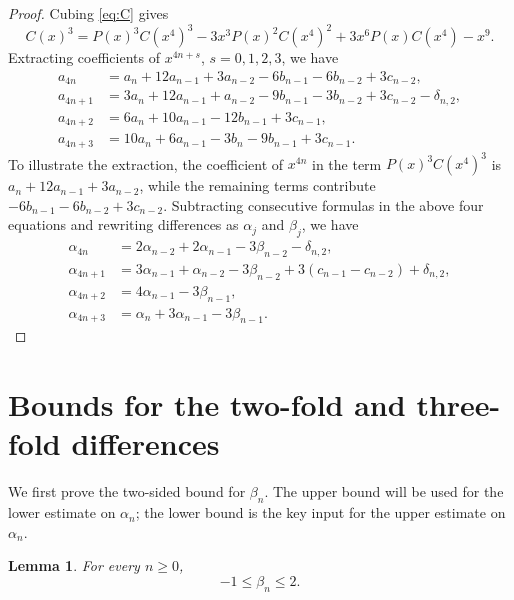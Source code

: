 \documentclass[10pt,a4paper]{amsart}
\newtheorem{lemma}[theorem]{Lemma}
\begin{document}
\begin{proof}
Cubing \eqref{eq:C} gives
\[
C(x)^3=P(x)^3C(x^4)^3-3x^3P(x)^2C(x^4)^2+3x^6P(x)C(x^4)-x^9.
\]
Extracting coefficients of $x^{4n+s}$, $s=0,1,2,3$, we have
\[
\begin{aligned}
a_{4n}&=a_n+12a_{n-1}+3a_{n-2}-6b_{n-1}-6b_{n-2}+3c_{n-2},\\
a_{4n+1}&=3a_n+12a_{n-1}+a_{n-2}-9b_{n-1}-3b_{n-2}+3c_{n-2}-\delta_{n,2},\\
a_{4n+2}&=6a_n+10a_{n-1}-12b_{n-1}+3c_{n-1},\\
a_{4n+3}&=10a_n+6a_{n-1}-3b_n-9b_{n-1}+3c_{n-1}.
\end{aligned}
\]
To illustrate the extraction, the coefficient of $x^{4n}$ in the term $P(x)^3C(x^4)^3$ is $a_n+12a_{n-1}+3a_{n-2}$, while the remaining terms contribute $-6b_{n-1}-6b_{n-2}+3c_{n-2}$.
Subtracting consecutive formulas in the above four equations and rewriting differences as $\alpha_j$ and $\beta_j$, we have
\[
\begin{aligned}
\alpha_{4n}&=2\alpha_{n-2}+2\alpha_{n-1}-3\beta_{n-2}-\delta_{n,2},\\
\alpha_{4n+1}&=3\alpha_{n-1}+\alpha_{n-2}-3\beta_{n-2}+3(c_{n-1}-c_{n-2})+\delta_{n,2},\\
\alpha_{4n+2}&=4\alpha_{n-1}-3\beta_{n-1},\\
\alpha_{4n+3}&=\alpha_n+3\alpha_{n-1}-3\beta_{n-1}.
\end{aligned}
\]
\end{proof}

\section{Bounds for the two-fold and three-fold differences}

We first prove the two-sided bound for $\beta_n$. The upper bound will be used for the lower estimate on $\alpha_n$; the lower bound is the key input for the upper estimate on $\alpha_n$.

\begin{lemma}\label{lem:beta-bound}
For every $n\ge 0$,
\[
-1\le \beta_n\le 2.
\]
\end{lemma}
\end{document}
